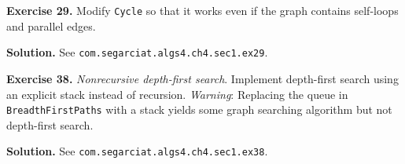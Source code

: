 \documentclass[12pt, a4paper]{article}
\newenvironment{ex}[2][Exercise]
{\par\medskip\noindent \textbf{#1 #2.}}
{\medskip}
\newenvironment{sol}[1][Solution]
{\par\medskip\noindent \textbf{#1.} }
{\medskip}
\begin{document}
	\begin{ex}{29}
		Modify \texttt{Cycle} so that it works even if the graph contains self-loops and
		parallel edges.
	\end{ex}
	\begin{sol}
		See \texttt{com.segarciat.algs4.ch4.sec1.ex29}.
	\end{sol}
	\begin{ex}{38}
		\emph{Nonrecursive depth-first search}. Implement depth-first search using an
		explicit stack instead of recursion. \emph{Warning}: Replacing the queue in
		\texttt{BreadthFirstPaths} with a stack yields some graph searching algorithm
		but not depth-first search.
	\end{ex}
	\begin{sol}
		See \texttt{com.segarciat.algs4.ch4.sec1.ex38}.
	\end{sol}
	\pagebreak
	\printbibliography
\end{document}
